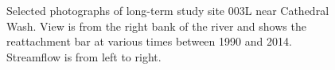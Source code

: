 \begin{figure}[t!]
\caption{Selected photographs of long-term study site 003L near Cathedral Wash.  View is from the right bank of the river and shows the reattachment bar at various times between 1990 and 2014. Streamflow is from left to right.   }
\end{figure}



\clearpage
		
